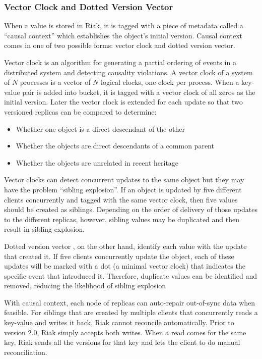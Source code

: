 \documentclass[11pt]{book}
\begin{document}
\subsubsection{Vector Clock and Dotted Version Vector}
When a value is stored in Riak, it is tagged with a piece of metadata called a ``causal context'' which establishes the object's initial version. Causal context comes in one of two possible forms: vector clock and dotted version vector.

Vector clock \cite{fidge1988timestamps, Mattern89virtualtime} is an algorithm for generating a partial ordering of events in a distributed system and detecting causality violations. A vector clock of a system of $N$ processes is a vector of $N$ logical clocks, one clock per process. When a key-value pair is added into bucket, it is tagged with a vector clock of all zeros as the initial version. Later the vector clock is extended for each update so that two versioned replicas can be compared to determine:
\begin{itemize}
\item Whether one object is a direct descendant of the other
\item Whether the objects are direct descendants of a common parent
\item Whether the objects are unrelated in recent heritage
\end{itemize}

Vector clocks can detect concurrent updates to the same object but they may have the problem ``sibling explosion''. If an object is updated by five different clients concurrently and tagged with the same vector clock, then five values should be created as siblings. Depending on the order of delivery of those updates to the different replicas, however, sibling values may be duplicated and then result in sibling explosion.

Dotted version vector \cite{Preguica:2012:BAE}, on the other hand, identify each value with the update that created it. If five clients concurrently update the object, each of these updates will be marked with a dot (a minimal vector clock) that indicates the specific event that introduced it. Therefore, duplicate values can be identified and removed, reducing the likelihood of sibling explosion

With causal context, each node of replicas can auto-repair out-of-sync data when feasible. For siblings that are created by multiple clients that concurrently reads a key-value and writes it back, Riak cannot reconcile automatically. Prior to version 2.0, Riak simply accepts both writes. When a read comes for the same key, Riak sends all the versions for that key and lets the client to do manual reconciliation.
\end{document}
